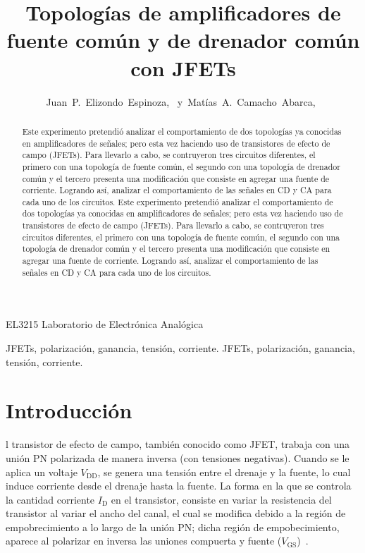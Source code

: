 \documentclass[journal]{IEEEtran}
\begin{document}
\title{Topologías de amplificadores de fuente común y de drenador común con JFETs}


\author{Juan~P.~Elizondo~Espinoza,~
        y~Matías~A.~Camacho~Abarca,~
}


%
{EL3215 Laboratorio de Electrónica Analógica}


\maketitle


\begin{abstract}
Este experimento pretendió analizar el comportamiento de dos topologías ya conocidas en amplificadores de señales; pero esta vez haciendo uso de
transistores de efecto de campo (JFETs). Para llevarlo a cabo, se contruyeron tres circuitos diferentes, el primero con una topología de 
fuente común, el segundo con una topología de drenador común y el tercero presenta una modificación que consiste en agregar una fuente de corriente.
Logrando así, analizar el comportamiento de las señales en CD y CA para cada uno de los circuitos. 
Este experimento pretendió analizar el comportamiento de dos topologías ya conocidas en amplificadores de señales; pero esta vez haciendo uso de
transistores de efecto de campo (JFETs). Para llevarlo a cabo, se contruyeron tres circuitos diferentes, el primero con una topología de 
fuente común, el segundo con una topología de drenador común y el tercero presenta una modificación que consiste en agregar una fuente de corriente.
Logrando así, analizar el comportamiento de las señales en CD y CA para cada uno de los circuitos. 
\end{abstract}

\begin{IEEEkeywords}
JFETs, polarización, ganancia, tensión, corriente.
JFETs, polarización, ganancia, tensión, corriente.
\end{IEEEkeywords}


\section{Introducción}

l transistor de efecto de campo, también conocido como JFET, trabaja con una unión PN
polarizada de manera inversa (con tensiones negativas). Cuando se le aplica un voltaje $V_{\text{DD}}$, se genera 
una tensión entre el drenaje y la fuente, lo cual induce corriente desde el drenaje hasta la fuente. La forma en la 
que se controla la cantidad corriente $I_{\text{D}}$ en el transistor, consiste en variar la resistencia del transistor
al variar el ancho del canal, el cual se modifica debido a la región de empobrecimiento a lo largo de la unión PN;
dicha región de empobecimiento, aparece al polarizar en inversa las uniones compuerta y fuente ($V_{\text{GS}}$)~\cite{Floyd}.
\end{document}
